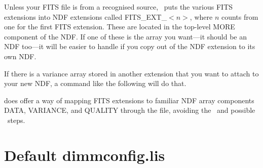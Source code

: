 \documentclass[11pt,oneside,chapters]{starlink}
\begin{document}
\begin{terminalv}
\end{terminalv}

Unless your FITS file is from a recognised source, \fitstondf\ puts the
various FITS extensions into NDF extensions called FITS\_EXT\_$<n>$,
where $n$ counts from one for the first FITS extension. These are
located in the top-level MORE component of the NDF. If one of these is
the array you want---it should be an NDF too---it will be easier to
handle if you copy out of the NDF extension to its own NDF.

\begin{terminalv}
\end{terminalv}

If there is a variance array stored in another extension that you want
to attach to your new NDF, a command like the following will do that.

\begin{terminalv}
\end{terminalv}

 does offer a way of mapping FITS extensions to familiar NDF
array components DATA, VARIANCE, and QUALITY through the  file,
avoiding the \ndfcopy\ and possible \setvar\ steps.


\newpage
\chapter{Default dimmconfig.lis}
\label{app:dimm}
\raggedbottom
\end{document}

